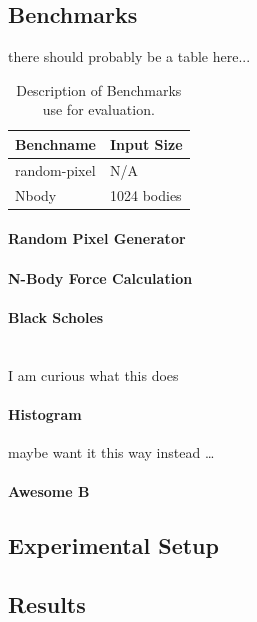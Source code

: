 \subsection{Benchmarks}
there should probably be a table here...
\begin{table}
	\begin{center}
		\begin{tabular}{| l | l |}
			\hline
			Benchname & Input Size \\
			\hline
			random-pixel & N/A \\
			\hline
			Nbody &  1024 bodies \\
			\hline
		\end{tabular}
	\end{center}
	\caption{Description of Benchmarks use for evaluation.}
	\label{benchmark-table}
\end{table}

\paragraph{Random Pixel Generator}

\paragraph{N-Body Force Calculation}

\paragraph{Black Scholes} \hspace{0pt}\\
I am curious what this does


\paragraph{Histogram}
maybe want it this way instead \ldots

\paragraph{Awesome B}

\subsection{Experimental Setup}

\subsection{Results}

